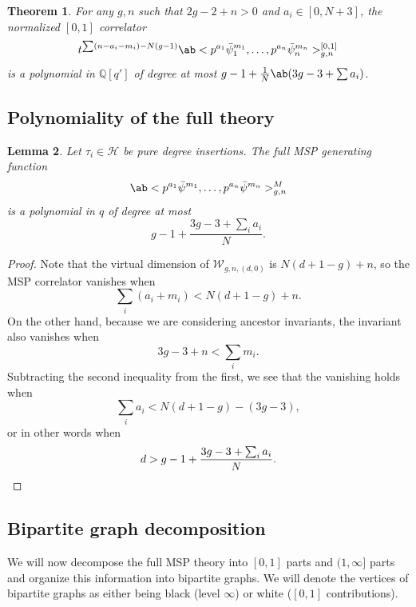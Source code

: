 \documentclass[10pt]{amsart}
\newtheorem{thm}{Theorem}[section]
\newtheorem{lem}[thm]{Lemma}
\theoremstyle{definition}
\theoremstyle{remark}
\theoremstyle{plain}
\theoremstyle{definition}
\theoremstyle{remark}
\newcommand{\Q}{\mathbb{Q}}
\newcommand{\msc}[1]{\mathscr{#1}}
\newcommand{\1}{\mathbf{1}}
\newcommand{\2}{\mathbf{2}}
\newcommand{\3}{\mathbf{3}}
\numberwithin{equation}{section}
\begin{document}
\begin{thm}\label{thm:polynomiality01}
    For any $g,n$ such that $2g-2+n > 0$ and $a_i \in [0, N+3]$, the normalized $[0,1]$ correlator
    \[ t^{\sum (n-a_i - m_i) - N(g-1)}\ab<p^{a_1} \bar{\psi}_1^{m_1}, \ldots, p^{a_n} \bar{\psi}_n^{m_n}>_{g,n}^{[0,1]} \]
    is a polynomial in $\Q[q']$ of degree at most $g-1+\frac{1}{N}\ab(3g-3+\sum a_i)$.
\end{thm}

\subsection{Polynomiality of the full theory}%
\label{sub:Polynomiality of the full theory}

\begin{lem}\label{lem:fullpolynomiality}
    Let $\tau_i \in \msc{H}$ be pure degree insertions. The full MSP generating function
    \[ \ab<p^{a_1}\bar{\psi}^{m_1}, \ldots, p^{a_n} \bar{\psi}^{m_n}>_{g,n}^M \]
    is a polynomial in $q$ of degree at most 
    \[ g-1 + \frac{3g-3 + \sum_i a_i}{N}. \]
\end{lem}

\begin{proof}
    Note that the virtual dimension of $\msc{W}_{g,n,(d,0)}$ is $N(d+1-g)+n$, so the MSP correlator vanishes when
    \[ \sum_i (a_i + m_i) < N(d+1-g)+n. \]
    On the other hand, because we are considering ancestor invariants, the invariant also vanishes when
    \[ 3g-3+n < \sum_i m_i. \]
    Subtracting the second inequality from the first, we see that the vanishing holds when
    \[ \sum_i a_i < N(d+1-g) - (3g-3), \]
    or in other words when
    \[ d > g-1 + \frac{3g-3+\sum_i a_i}{N}. \qedhere \]
\end{proof}

\subsection{Bipartite graph decomposition}%
\label{sub:Bipartite graph decomposition}

We will now decompose the full MSP theory into $[0,1]$ parts and $(1,\infty]$ parts and organize this information into bipartite graphs. We will denote the vertices of bipartite graphs as either being black (level $\infty$) or white ($[0,1]$ contributions).
\end{document}

